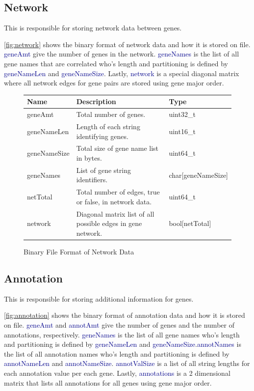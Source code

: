 \documentclass[10pt]{article}
\providecommand{\h}[1]{\textcolor{darkblue}{#1}}
\begin{document}
\subsection{Network}

This is responsible for storing network data between genes.

\autoref{fig:network} shows the binary format of network data and how it is 
stored on file. \h{geneAmt} give the number of genes in the network. 
\h{geneNames} is the list of all gene names that are correlated who's length 
and 
partitioning is defined by \h{geneNameLen} and \h{geneNameSize}. Lastly, 
\h{network} is a special diagonal matrix where all network edges for gene pairs 
are stored using gene major order.

\begin{figure}[H]
\begin{mdframed}[style=btable]
\begin{tabularx}{\textwidth}{|l|X|l|}
\hline
\textbf{Name} & \textbf{Description} & \textbf{Type} \\
\hline
geneAmt & Total number of genes. & uint32\_t \\
\hline
geneNameLen & Length of each string identifying genes. & uint16\_t \\
\hline
geneNameSize & Total size of gene name list in bytes. & uint64\_t \\
\hline
geneNames & List of gene string identifiers. & char[geneNameSize] \\
\hline
netTotal & Total number of edges, true or false, in network data. & uint64\_t \\
\hline
network & Diagonal matrix list of all possible edges in gene network. & 
bool[netTotal] \\
\hline
\end{tabularx}
\end{mdframed}
\caption{Binary File Format of Network Data}
\label{fig:network}
\end{figure}

\subsection{Annotation}

This is responsible for storing additional information for genes.

\autoref{fig:annotation} shows the binary format of annotation data and how it 
is stored on file. \h{geneAmt} and \h{annotAmt} give the number of genes and 
the number of annotations, respectively. \h{geneNames} is the list of all gene 
names who's length and partitioning is defined by \h{geneNameLen} and 
\h{geneNameSize}.\h{annotNames} is the list of all annotation names who's 
length and partitioning is defined by \h{annotNameLen} and \h{annotNameSize}.
\h{annotValSize} is a list of all string lengths for each annotation value per 
each gene. Lastly, \h{annotations} is a 2 dimensional matrix that lists all 
annotations for all genes using gene major order.
\end{document}
